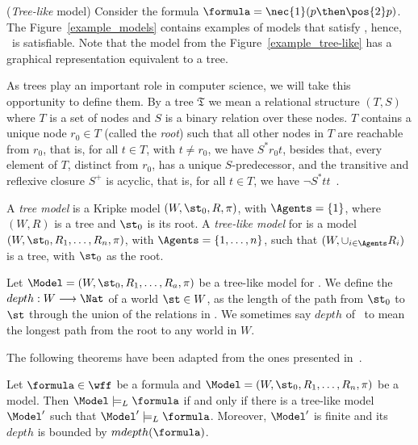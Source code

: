 \begin{example}%
    \label{ex2}
    (\emph{Tree-like} model) Consider the formula $\formula = \nec{1} (p \then
    \pos{2} p)$. The Figure~\ref{example_models} contains examples of models
    that satisfy \formula, hence, \formula\ is satisfiable. Note that the model
    from the Figure~\ref{example_tree-like} has a graphical representation
    equivalent to a tree. 


 
    As trees play an important role in computer science, we will take this
    opportunity to define them. By a tree $\mathfrak{T}$ we mean a relational
    structure $(T, S)$ where $T$ is a set of nodes and $S$ is a binary relation
    over these nodes. $T$ contains a unique node $r_0 \in T$ (called the
    \emph{root}) such that all other nodes in $T$ are reachable from $r_0$, that
    is, for all $t \in T$, with $t \neq r_0$, we have $S^*r_0 t$, besides that,
    every element of $T$, distinct from $r_0$, has a unique $S$-predecessor, and
    the transitive and reflexive closure $S^+$ is acyclic, that is, for all $t
    \in T$, we have $\neg S^* t t$~\cite{areces2000tree}.

    A \emph{tree model} is a Kripke model $(W, \st_0, R, \pi)$, with $\Agents =
    \{1\}$, where $(W, R)$ is a tree and $\st_0$ is its root. A \emph{tree-like
    model} for  is a model $(W, \st_0, R_1, \ldots, R_n, \pi)$,
    with $\Agents = \{1, \ldots, n\}$, such that $(W, \cup_{i \in \Agents} R_i)$
    is a tree, with $\st_0$ as the root.

    Let $\Model = (W, \st_0, R_1, \ldots, R_a, \pi)$ be a tree-like model for
    . We define the $depth: W \longrightarrow \Nat$ of a world
    $\st \in W$, as the length of the path from $\st_0$ to $\st$ through the
    union of the relations in \Model. We sometimes say $depth$ of \Model~to mean
    the longest path from the root to any world in $W$.

    The following theorems have been adapted from the ones presented
    in~\cite{areces2000tree}.

    \begin{theorem}%
        \label{theo:tl1}
        Let $\formula \in \wff$ be a formula and $\Model = (W, \st_0, R_1,
        \ldots, R_n, \pi)$ be a model. Then $\Model \models_L \formula$ if and only if
        there is a tree-like model $\Model'$ such that $\Model' \models_L \formula$.
        Moreover, $\Model'$ is finite and its $depth$ is bounded by
        $mdepth(\formula)$.
    \end{theorem}


\end{example}
